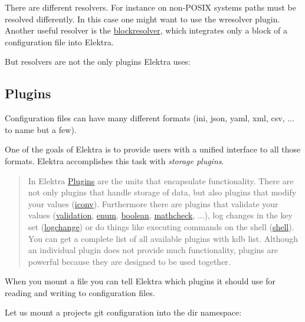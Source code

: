 There are different resolvers. For instance on non-\/\+P\+O\+S\+IX systems paths must be resolved differently. In this case one might want to use the wresolver plugin. Another useful resolver is the \hyperlink{md_src_plugins_blockresolver_README_src_plugins_blockresolver_README_md}{blockresolver}, which integrates only a block of a configuration file into Elektra.

But resolvers are not the only plugins Elektra uses\+:

\subsection*{Plugins}

Configuration files can have many different formats ({\ttfamily ini}, {\ttfamily json}, {\ttfamily yaml}, {\ttfamily xml}, {\ttfamily csv}, ... to name but a few).

One of the goals of Elektra is to provide users with a unified interface to all those formats. Elektra accomplishes this task with {\itshape storage plugins}.

\begin{quote}
In Elektra \hyperlink{doc_tutorials_plugins_md}{Plugins} are the units that encapsulate functionality. There are not only plugins that handle storage of data, but also plugins that modify your values (\hyperlink{md_src_plugins_iconv_README_src_plugins_iconv_README_md}{iconv}). Furthermore there are plugins that validate your values (\hyperlink{md_src_plugins_validation_README_src_plugins_validation_README_md}{validation}, \hyperlink{md_src_plugins_enum_README_src_plugins_enum_README_md}{enum}, \hyperlink{md_src_plugins_boolean_README_src_plugins_boolean_README_md}{boolean}, \hyperlink{md_src_plugins_mathcheck_README_src_plugins_mathcheck_README_md}{mathcheck}, ...), log changes in the key set (\hyperlink{md_src_plugins_logchange_README_src_plugins_logchange_README_md}{logchange}) or do things like executing commands on the shell (\hyperlink{md_src_plugins_shell_README_src_plugins_shell_README_md}{shell}). You can get a complete list of all available plugins with {\ttfamily kdb list}. Although an individual plugin does not provide much functionality, plugins are powerful because they are designed to be used together. \end{quote}


When you mount a file you can tell Elektra which plugins it should use for reading and writing to configuration files.

Let us mount a projects git configuration into the dir namespace\+:


